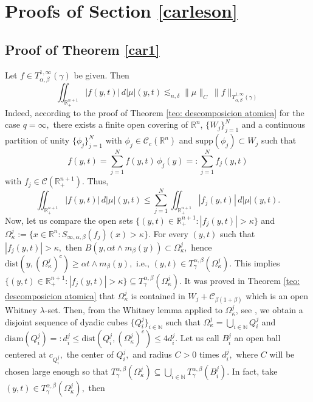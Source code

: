 \documentclass[leqno,11pt]{amsart}
\theoremstyle{plain}
\theoremstyle{remark}
\begin{document}
{{\section{Proofs of Section \ref{carleson}}
\subsection{Proof of Theorem \ref{car1}}\label{car1proof}
{{ Let $f\in T^{1,\infty}_{\alpha, \beta}(\gamma)$ be given. Then \begin{equation}\label{acotacionmu}
    \iint_{\mathbb{R}^{n+1}_+}|f(y,t)|\, d|\mu| (y,t)\lesssim_{n,\delta} \|\mu\|_C\ \|f\|_{T_{\alpha,\beta}^{1,\infty}(\gamma)}
\end{equation} 
Indeed, according to the proof of Theorem \ref{teo: descomposicion atomica} for the case $q=\infty,$ there exists a finite open covering of $\mathbb{R}^n$, $\{W_j\}_{j=1}^N$ and a continuous partition of unity $\{\phi_j\}_{j=1}^N$ with $\phi_j\in \mathscr{C}_c(\mathbb{R}^n)$ and $\text{supp}(\phi_j)\subset W_j$ such that $$f(y,t)=\sum_{j=1}^N f(y,t)\, \phi_j(y)=:\sum_{j=1}^N f_j(y,t)$$ with $f_j\in \mathscr{C}(\mathbb{R}^{n+1}_+).$ Thus,
$$\iint_{\mathbb{R}^{n+1}_+}|f(y,t)|\, d|\mu|(y,t)\le \sum_{j=1}^N \iint_{\mathbb{R}^{n+1}_+}|f_j(y,t)|\, d|\mu|(y,t).$$
Now, let us compare the open sets $\{(y,t)\in \mathbb{R}^{n+1}_+: |f_j(y,t)|>\kappa \}$ and $\Omega_\kappa^j:=\{x\in \mathbb{R}^n: S_{\infty, \alpha, \beta}(f_j)(x)>\kappa\}.$ For every $(y,t)$ such that $|f_j(y,t)|>\kappa,$ then $B(y,\alpha t\wedge m_\beta(y))\subset \Omega_\kappa^j,$ hence $\text{dist}(y,(\Omega_\kappa^j)^c)\ge \alpha t\wedge m_\beta (y),$ i.e., $(y,t)\in T^{\alpha, \beta}_\gamma(\Omega_\kappa^j).$ This implies $\{(y,t)\in \mathbb{R}^{n+1}_+: |f_j(y,t)|>\kappa\}\subseteq T_\gamma^{\alpha, \beta}(\Omega_\kappa^j).$ It was proved in Theorem \ref{teo: descomposicion atomica}  that $\Omega_\kappa^j$ is contained in $W_j+\mathscr{C}_{\beta(1+\beta)}$ which is an open Whitney $\lambda$-set. Then, from the Whitney lemma applied to $\Omega_\kappa^j$, see \cite{Stein-Singular integrals and differentiability properties}, we obtain a disjoint sequence of dyadic cubes $\{Q_i^j\}_{i\in {\mathbb N}}$ such that $\Omega_\kappa^j=\bigcup_{i\in {\mathbb N}}Q_i^j$ and $\text{diam}(Q_i^j)=:d_i^j\le \text{dist}(Q_i^j,(\Omega_\kappa^j)^c)\le 4 d_i^j.$ Let us call $B_i^j$ an open ball centered at $c_{Q_i^j},$ the center of $Q_i^j,$ and radius $C>0$ times $d_i^j,$ where $C$ will be chosen large enough so that $T^{\alpha, \beta}_\gamma(\Omega_\kappa^j)\subseteq \bigcup_{i\in {\mathbb N}}T_\gamma^{\alpha, \beta}(B_i^j).$ In fact, take $(y,t)\in T^{\alpha, \beta}_\gamma(\Omega_\kappa^j),$ then 
}}}}
\end{document}
